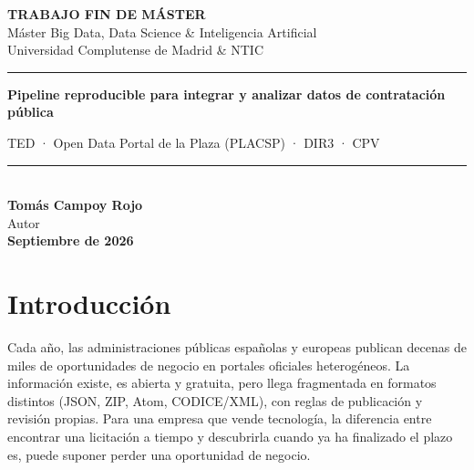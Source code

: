 \documentclass[11pt,a4paper]{article}
\begin{document}
\begin{titlepage}
\raggedright
{\small\bfseries\MakeUppercase{Trabajo Fin de Máster}}\\[3pt]
{\small\color{muted}Máster Big Data, Data Science \& Inteligencia Artificial}\\[2pt]
{\small\color{muted}Universidad Complutense de Madrid \& NTIC}\\[1em]
{\color{ink}\rule{\textwidth}{0.8pt}}

\vspace{4cm}

{\fontsize{32}{37}\selectfont\bfseries
Pipeline reproducible para integrar y analizar datos de contratación pública\par}

\vspace{1.2cm}

{\large\color{muted}TED · Open Data Portal de la Plaza (PLACSP) · DIR3 · CPV\par}

\vfill

{\color{line}\rule{\textwidth}{0.4pt}}\\[1em]
{\bfseries Tomás Campoy Rojo}\\[2pt]
{\color{muted}Autor}\\[0.9em]
{\bfseries Septiembre de 2026}
\end{titlepage}

\tableofcontents
\clearpage

\section{Introducción}

Cada año, las administraciones públicas españolas y europeas publican decenas de
miles de oportunidades de negocio en portales oficiales heterogéneos. La
información existe, es abierta y gratuita, pero llega fragmentada en formatos
distintos (JSON, ZIP, Atom, CODICE/XML), con reglas de publicación y revisión
propias. Para una empresa que vende tecnología, la diferencia entre encontrar
una licitación a tiempo y descubrirla cuando ya ha finalizado el plazo es,
puede suponer perder una oportunidad de negocio.
\end{document}

